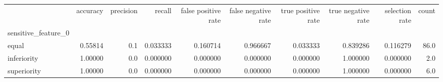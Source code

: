 \begin{tabular}{lrrrrrrrrr}
\toprule
{} &  accuracy &  precision &    recall &  false positive rate &  false negative rate &  true positive rate &  true negative rate &  selection rate &  count \\
sensitive\_feature\_0 &           &            &           &                      &                      &                     &                     &                 &        \\
\midrule
equal               &   0.55814 &        0.1 &  0.033333 &             0.160714 &             0.966667 &            0.033333 &            0.839286 &        0.116279 &   86.0 \\
inferiority         &   1.00000 &        0.0 &  0.000000 &             0.000000 &             0.000000 &            0.000000 &            1.000000 &        0.000000 &    2.0 \\
superiority         &   1.00000 &        0.0 &  0.000000 &             0.000000 &             0.000000 &            0.000000 &            1.000000 &        0.000000 &    6.0 \\
\bottomrule
\end{tabular}
